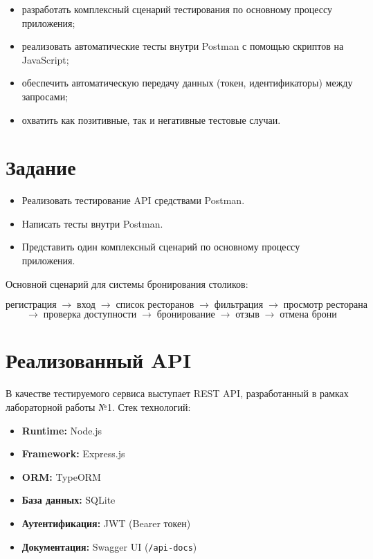 \documentclass[a4paper,14pt]{extarticle}
\begin{document}
\begin{itemize}[leftmargin=2cm]
  \item разработать комплексный сценарий тестирования по основному процессу приложения;
  \item реализовать автоматические тесты внутри Postman с помощью скриптов на JavaScript;
  \item обеспечить автоматическую передачу данных (токен, идентификаторы) между запросами;
  \item охватить как позитивные, так и негативные тестовые случаи.
\end{itemize}

\section{Задание}

\begin{itemize}[leftmargin=2cm]
  \item Реализовать тестирование API средствами Postman.
  \item Написать тесты внутри Postman.
  \item Представить один комплексный сценарий по основному процессу приложения.
\end{itemize}

Основной сценарий для системы бронирования столиков:

\[
\textit{регистрация} \;\to\; \textit{вход} \;\to\; \textit{список ресторанов} \;\to\;
\textit{фильтрация} \;\to\; \textit{просмотр ресторана}
\]
\[
\;\to\; \textit{проверка доступности} \;\to\; \textit{бронирование} \;\to\;
\textit{отзыв} \;\to\; \textit{отмена брони}
\]

\section{Реализованный API}

В качестве тестируемого сервиса выступает REST API, разработанный в рамках лабораторной
работы №1. Стек технологий:

\begin{itemize}[leftmargin=2cm]
  \item \textbf{Runtime:} Node.js
  \item \textbf{Framework:} Express.js
  \item \textbf{ORM:} TypeORM
  \item \textbf{База данных:} SQLite
  \item \textbf{Аутентификация:} JWT (Bearer токен)
  \item \textbf{Документация:} Swagger UI (\texttt{/api-docs})
\end{itemize}
\end{document}
